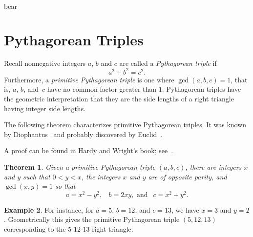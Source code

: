 \documentclass[12pt,table]{article}
\newtheorem{theorem}{Theorem}[section]
\theoremstyle{definition}
\newtheorem{example}[theorem]{Example}
\theoremstyle{remark}
\newcommand{\vanish}[1]{}
\newcommand{\fix}[1]{\todo[inline]{#1}}
\numberwithin{equation}{section}
\begin{document}
\listoftodos

\fix{koala}

bear



\section{Pythagorean Triples}




Recall nonnegative integers $a$, $b$ and $c$ are called a
{\em Pythagorean triple} if
$$
    a^2 + b^2 = c^2.
$$
Furthermore, a {\em primitive Pythagorean triple}
is one where $\gcd(a,b,c) = 1$, that is,
$a$, $b$, and~$c$ have  no common factor greater than $1$.
Pythagorean triples have the geometric interpretation that
they are the side lengths of a right triangle having integer
side lengths.




The following theorem characterizes primitive Pythagorean triples.
It was known by Diophantus~\cite[Page 93]{Heath} and
probably discovered by Euclid~\cite{Euclid}.




A proof can be found in Hardy and Wright's book; 
see~\cite[XIII, 13.2]{Hardy_and_Wright}.



\vanish{
Also see page 295 of Heath for
Fermat's area of triangle result.}



\begin{theorem}
Given a primitive
Pythagorean triple $(a,b,c)$, there are integers
$x$ and $y$ such that $0 < y < x$, 
the integers
$x$ and $y$ are of opposite parity,
and
$\gcd(x,y) = 1$
so that
\begin{equation}
\label{equation_primitive_Pythagorean_triple}
     a = x^2-y^2, \:\:\:\: 
     b = 2xy, \mbox{  and  } \:\: c=x^2+y^2.
\end{equation}
\end{theorem}


\begin{example}
{\rm
For instance, 
for
$a = 5$, $b = 12$, and $c = 13$,
we have
$x = 3$
and $y = 2$.
Geometrically this gives the primitive Pythagorean triple
$(5, 12, 13)$ corresponding to the 
$5$-$12$-$13$ right triangle. 
}
\end{example}
\end{document}
